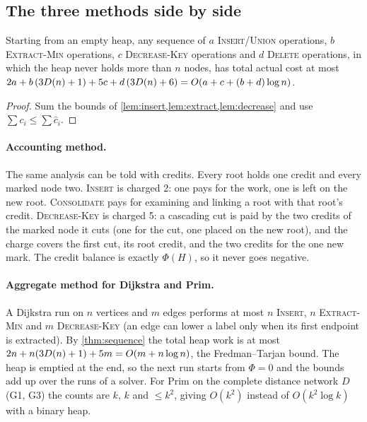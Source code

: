 \subsection{The three methods side by side}
\begin{theorem}\label{thm:sequence}
Starting from an empty heap, any sequence of \(a\) \textsc{Insert}/\textsc{Union} operations, \(b\) \textsc{Extract-Min}
operations, \(c\) \textsc{Decrease-Key} operations and \(d\) \textsc{Delete} operations, in which the heap never holds more
than \(n\) nodes, has total actual cost at most \(2a+b\,(3D(n)+1)+5c+d\,(3D(n)+6)=O(a+c+(b+d)\log n)\).
\end{theorem}
\begin{proof}
Sum the bounds of \cref{lem:insert,lem:extract,lem:decrease} and use \(\sum c_i\le\sum\hat c_i\).
\end{proof}

\paragraph{Accounting method.} The same analysis can be told with credits. Every root holds one credit and every
marked node two. \textsc{Insert} is charged 2: one pays for the work, one is left on the new root. \textsc{Consolidate}
pays for examining and linking a root with that root's credit. \textsc{Decrease-Key} is charged 5: a cascading cut is
paid by the two credits of the marked node it cuts (one for the cut, one placed on the new root), and the charge covers
the first cut, its root credit, and the two credits for the one new mark. The credit balance is exactly
\(\Phi(H)\), so it never goes negative.

\paragraph{Aggregate method for Dijkstra and Prim.} A Dijkstra run on \(n\) vertices and \(m\) edges performs at most
\(n\) \textsc{Insert}, \(n\) \textsc{Extract-Min} and \(m\) \textsc{Decrease-Key} (an edge can lower a label only when its
first endpoint is extracted). By \cref{thm:sequence} the total heap work is at most
\(2n+n(3D(n)+1)+5m=O(m+n\log n)\), the Fredman--Tarjan bound. The heap is emptied at the end, so the next run starts
from \(\Phi=0\) and the bounds add up over the runs of a solver. For Prim on the complete distance network \(D\)
(G1, G3) the counts are \(k\), \(k\) and \(\le k^2\), giving \(O(k^2)\) instead of \(O(k^2\log k)\) with a binary heap.

